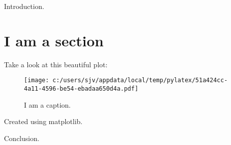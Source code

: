 \documentclass{beamer}%
\begin{document}
%
\normalsize%
Introduction.%
\section{I am a section}%
\label{sec:I am a section}%
Take a look at this beautiful plot:%


\begin{figure}[htbp]%
\centering%
\texttt{[image: c:/users/sjv/appdata/local/temp/pylatex/51a424cc-4a11-4596-be54-ebadaa650d4a.pdf]}%
\caption{I am a caption.}%
\end{figure}

%
Created using matplotlib.

%
Conclusion.%
\end{document}

